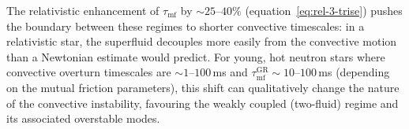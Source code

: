 The relativistic enhancement of $\tau_{\mathrm{mf}}$ by $\sim 25$--$40\%$
(equation~\eqref{eq:rel-3-trise}) pushes the boundary between these
regimes to shorter convective timescales: in a relativistic star, the
superfluid decouples more easily from the convective motion than a
Newtonian estimate would predict.  For young, hot neutron stars where
convective overturn timescales are $\sim 1$--$100\,$ms and
$\tau_{\mathrm{mf}}^{\mathrm{GR}} \sim 10$--$100\,$ms (depending on
the mutual friction parameters), this shift can qualitatively change
the nature of the convective instability, favouring the weakly coupled
(two-fluid) regime and its associated overstable modes.
